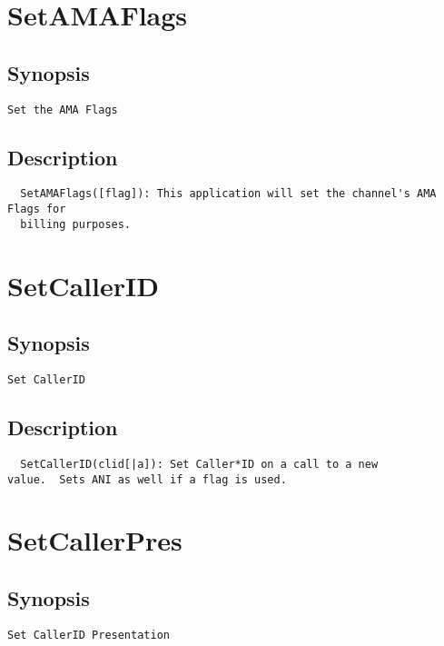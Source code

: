 \section{SetAMAFlags}
\subsection{Synopsis}
\begin{verbatim}
Set the AMA Flags
\end{verbatim}
\subsection{Description}
\begin{verbatim}
  SetAMAFlags([flag]): This application will set the channel's AMA Flags for
  billing purposes.

\end{verbatim}


\section{SetCallerID}
\subsection{Synopsis}
\begin{verbatim}
Set CallerID
\end{verbatim}
\subsection{Description}
\begin{verbatim}
  SetCallerID(clid[|a]): Set Caller*ID on a call to a new
value.  Sets ANI as well if a flag is used. 

\end{verbatim}


\section{SetCallerPres}
\subsection{Synopsis}
\begin{verbatim}
Set CallerID Presentation
\end{verbatim}
